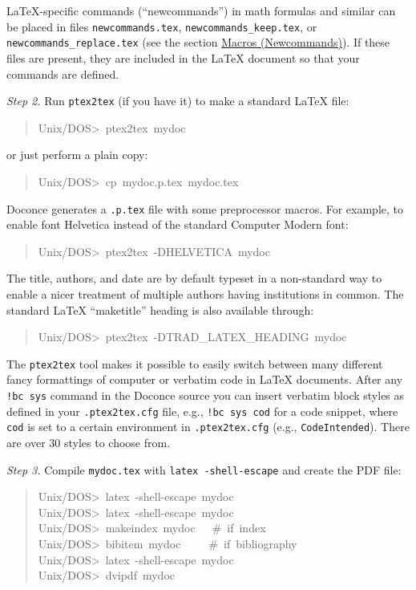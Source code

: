 \documentclass[a4paper,english]{article}
\begin{document}
LaTeX-specific commands (``newcommands'') in math formulas and similar
can be placed in files \texttt{newcommands.tex}, \texttt{newcommands\_keep.tex}, or
\texttt{newcommands\_replace.tex} (see the section \hyperref[macros-newcommands]{Macros (Newcommands)}).
If these files are present, they are included in the LaTeX document
so that your commands are defined.

\emph{Step 2.} Run \texttt{ptex2tex} (if you have it) to make a standard LaTeX file:
%
\begin{quote}{\ttfamily \raggedright \noindent
Unix/DOS>~ptex2tex~mydoc
}
\end{quote}

or just perform a plain copy:
%
\begin{quote}{\ttfamily \raggedright \noindent
Unix/DOS>~cp~mydoc.p.tex~mydoc.tex
}
\end{quote}

Doconce generates a \texttt{.p.tex} file with some preprocessor macros.
For example, to enable font Helvetica instead of the standard
Computer Modern font:
%
\begin{quote}{\ttfamily \raggedright \noindent
Unix/DOS>~ptex2tex~-DHELVETICA~mydoc
}
\end{quote}

The title, authors, and date are by default typeset in a non-standard
way to enable a nicer treatment of multiple authors having
institutions in common. The standard LaTeX ``maketitle'' heading
is also available through:
%
\begin{quote}{\ttfamily \raggedright \noindent
Unix/DOS>~ptex2tex~-DTRAD\_LATEX\_HEADING~mydoc
}
\end{quote}

The \texttt{ptex2tex} tool makes it possible to easily switch between many
different fancy formattings of computer or verbatim code in LaTeX
documents. After any \texttt{!bc sys} command in the Doconce source you can
insert verbatim block styles as defined in your \texttt{.ptex2tex.cfg}
file, e.g., \texttt{!bc sys cod} for a code snippet, where \texttt{cod} is set to
a certain environment in \texttt{.ptex2tex.cfg} (e.g., \texttt{CodeIntended}).
There are over 30 styles to choose from.

\emph{Step 3.} Compile \texttt{mydoc.tex} with \texttt{latex -shell-escape}
and create the PDF file:
%
\begin{quote}{\ttfamily \raggedright \noindent
Unix/DOS>~latex~-shell-escape~mydoc\\
Unix/DOS>~latex~-shell-escape~mydoc\\
Unix/DOS>~makeindex~mydoc~~~\#~if~index\\
Unix/DOS>~bibitem~mydoc~~~~~\#~if~bibliography\\
Unix/DOS>~latex~-shell-escape~mydoc\\
Unix/DOS>~dvipdf~mydoc
}
\end{quote}
\end{document}
